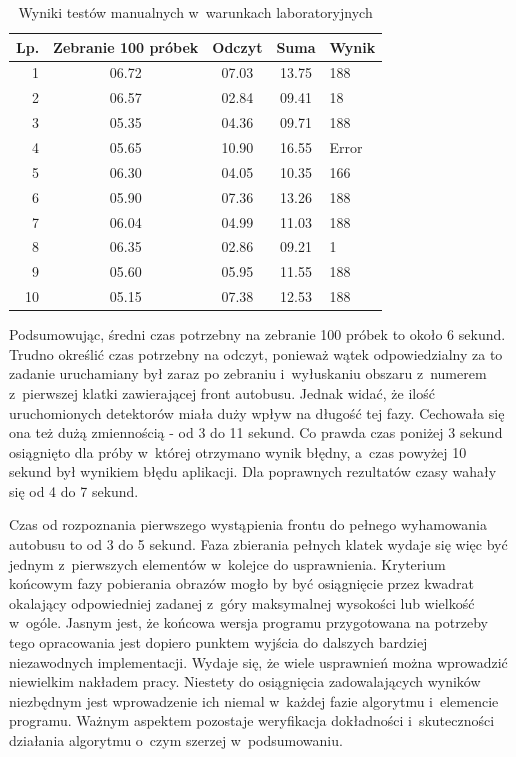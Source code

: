 \begin{table}[!h]
    \centering
    \begin{tabular}{r c c c l }
        Lp. & Zebranie 100 próbek   & Odczyt    & Suma  & Wynik \\ \hline
        1   & 06.72                 & 07.03     & 13.75 & 188   \\
        2   & 06.57                 & 02.84     & 09.41 & 18    \\
        3   & 05.35                 & 04.36     & 09.71 & 188   \\
        4   & 05.65                 & 10.90     & 16.55 & Error \\
        5   & 06.30                 & 04.05     & 10.35 & 166   \\
        6   & 05.90                 & 07.36     & 13.26 & 188   \\
        7   & 06.04                 & 04.99     & 11.03 & 188   \\
        8   & 06.35                 & 02.86     & 09.21 & 1     \\
        9   & 05.60                 & 05.95     & 11.55 & 188   \\
        10  & 05.15                 & 07.38     & 12.53 & 188   \\
    \end{tabular}
    \caption{Wyniki testów manualnych w~warunkach laboratoryjnych}
    \label{tab:imp_lab_final_test_result}
\end{table}

Podsumowując, średni czas potrzebny na zebranie 100 próbek to około 6
sekund. Trudno określić czas potrzebny na odczyt, ponieważ 
wątek odpowiedzialny za to zadanie uruchamiany był zaraz 
po zebraniu i~wyłuskaniu obszaru z~numerem z~pierwszej klatki 
zawierającej front autobusu. Jednak widać, że ilość uruchomionych
detektorów miała duży wpływ na długość tej fazy. Cechowała się
ona też dużą zmiennością - od 3 do 11 sekund. Co prawda czas 
poniżej 3 sekund osiągnięto dla próby w~której otrzymano wynik błędny,
a~czas powyżej 10 sekund był wynikiem błędu aplikacji. 
Dla poprawnych rezultatów czasy wahały się od 4 do 7 sekund.

Czas od rozpoznania pierwszego wystąpienia
frontu do pełnego wyhamowania autobusu to od 3 do 5 sekund. Faza zbierania 
pełnych klatek wydaje się więc być jednym z~pierwszych elementów 
w~kolejce do usprawnienia. Kryterium końcowym fazy pobierania obrazów
mogło by być osiągnięcie przez kwadrat okalający odpowiedniej 
zadanej z~góry maksymalnej wysokości lub wielkość w~ogóle. 
Jasnym jest, że końcowa wersja programu przygotowana na potrzeby
tego opracowania jest dopiero punktem wyjścia do dalszych 
bardziej niezawodnych implementacji. Wydaje się, że wiele usprawnień
można wprowadzić niewielkim nakładem pracy. Niestety 
do osiągnięcia zadowalających wyników niezbędnym jest wprowadzenie
ich niemal w~każdej fazie algorytmu i~elemencie programu. 
Ważnym aspektem pozostaje weryfikacja dokładności i~skuteczności
działania algorytmu o~czym szerzej w~podsumowaniu.

